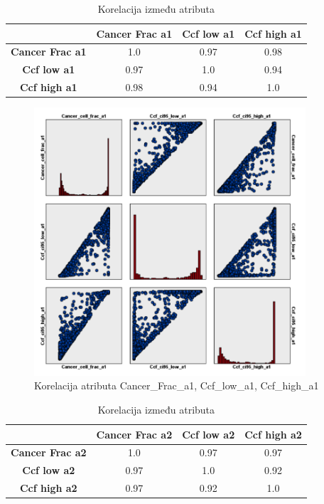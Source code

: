 \documentclass[a4paper]{article}
\begin{document}
\begin{table}[ht!]
\begin{center}
\caption{Korelacija između atributa}
\label{tab:korelacije4}
\begin{tabular}{c|c|c|c} \hline
& \textbf{Cancer Frac a1} & \textbf{Ccf low a1} & \textbf{Ccf high a1} \\ \hline
\textbf{Cancer Frac a1} & 1.0 & 0.97 & 0.98\\ \hline
\textbf{Ccf low a1} & 0.97 & 1.0 & 0.94\\ \hline
\textbf{Ccf high a1} & 0.98 & 0.94 & 1.0\\ \hline
\end{tabular}
\end{center}
\end{table}

\begin{figure}[ht!]
                \centering
                \includegraphics[width=0.9\textwidth]{korel_frac.PNG}
                \caption{Korelacija atributa Cancer\_Frac\_a1, Ccf\_low\_a1, Ccf\_high\_a1}
                \label{fig:korel_frac}
            \end{figure}

\begin{table}[ht!]
\begin{center}
\caption{Korelacija između atributa}
\label{tab:korelacije5}
\begin{tabular}{c|c|c|c} \hline
& \textbf{Cancer Frac a2} & \textbf{Ccf low a2} & \textbf{Ccf high a2} \\ \hline
\textbf{Cancer Frac a2} & 1.0 & 0.97 & 0.97\\ \hline
\textbf{Ccf low a2} & 0.97 & 1.0 & 0.92\\ \hline
\textbf{Ccf high a2} & 0.97 & 0.92 & 1.0\\ \hline
\end{tabular}
\end{center}
\end{table}
\end{document}
